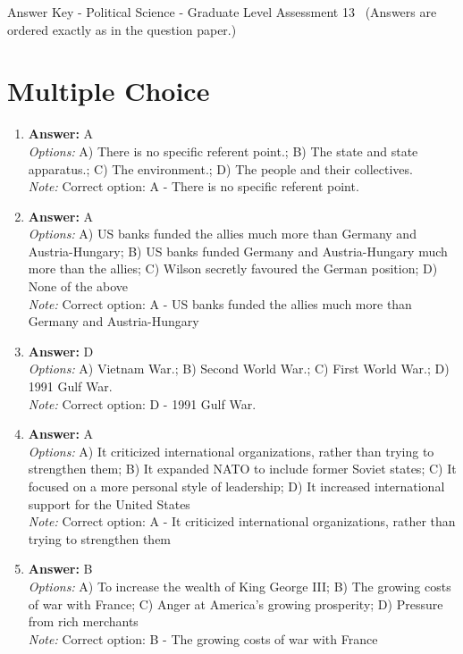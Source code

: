 \documentclass[12pt]{article}
\begin{document}
\begin{center}
Answer Key - Political Science - Graduate Level Assessment 13 \
\small (Answers are ordered exactly as in the question paper.)
\end{center}

\section*{Multiple Choice}
\begin{enumerate}[label=\arabic*.]
\item \textbf{Answer:} A
\\ \textit{Options:} A) There is no specific referent point.; B) The state and state apparatus.; C) The environment.; D) The people and their collectives.
\\ \textit{Note:} Correct option: A - There is no specific referent point.
\item \textbf{Answer:} A
\\ \textit{Options:} A) US banks funded the allies much more than Germany and Austria-Hungary; B) US banks funded Germany and Austria-Hungary much more than the allies; C) Wilson secretly favoured the German position; D) None of the above
\\ \textit{Note:} Correct option: A - US banks funded the allies much more than Germany and Austria-Hungary
\item \textbf{Answer:} D
\\ \textit{Options:} A) Vietnam War.; B) Second World War.; C) First World War.; D) 1991 Gulf War.
\\ \textit{Note:} Correct option: D - 1991 Gulf War.
\item \textbf{Answer:} A
\\ \textit{Options:} A) It criticized international organizations, rather than trying to strengthen them; B) It expanded NATO to include former Soviet states; C) It focused on a more personal style of leadership; D) It increased international support for the United States
\\ \textit{Note:} Correct option: A - It criticized international organizations, rather than trying to strengthen them
\item \textbf{Answer:} B
\\ \textit{Options:} A) To increase the wealth of King George III; B) The growing costs of war with France; C) Anger at America's growing prosperity; D) Pressure from rich merchants
\\ \textit{Note:} Correct option: B - The growing costs of war with France
\end{enumerate}
\end{document}
